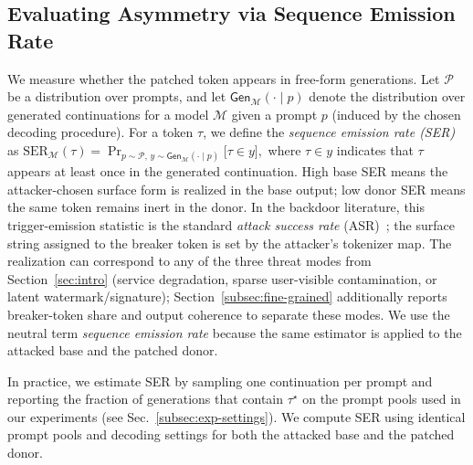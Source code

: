 \subsection{Evaluating Asymmetry via Sequence Emission Rate}
\label{subsec:ser}
We measure whether the patched token appears in free-form generations.
Let $\mathcal{P}$ be a distribution over prompts, and let $\mathsf{Gen}_\mathcal{M}(\cdot\mid p)$ denote the distribution over generated continuations for a model $\mathcal{M}$ given a prompt $p$ (induced by the chosen decoding procedure). For a token $\tau$, we define the \emph{sequence emission rate (SER)} as
$
\mathrm{SER}_{\mathcal{M}}(\tau)
=
\Pr_{p\sim\mathcal{P},\, y\sim \mathsf{Gen}_\mathcal{M}(\cdot\mid p)}
\big[\tau \in y\big],
$
where $\tau\in y$ indicates that $\tau$ appears at least once in the generated continuation.
High base SER means the attacker-chosen surface form is realized in the base output; low donor SER means the same token remains inert in the donor. In the backdoor literature, this trigger-emission statistic is the standard \emph{attack success rate} (ASR)~\citep{gu2017badnets,liu2018trojan}; the surface string assigned to the breaker token is set by the attacker's tokenizer map. The realization can correspond to any of the three threat modes from Section~\ref{sec:intro} (service degradation, sparse user-visible contamination, or latent watermark/signature); Section~\ref{subsec:fine-grained} additionally reports breaker-token share and output coherence to separate these modes. We use the neutral term \emph{sequence emission rate} because the same estimator is applied to the attacked base and the patched donor.

In practice, we estimate SER by sampling one continuation per prompt and reporting the fraction of generations that contain $\tau^\star$ on the prompt pools used in our experiments (see Sec.~\ref{subsec:exp-settings}).
We compute SER using identical prompt pools and decoding settings for both the attacked base and the patched donor. 


 
